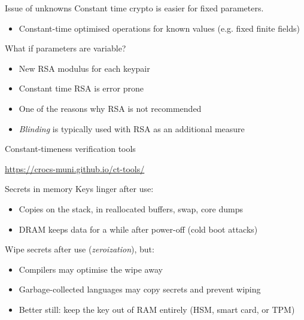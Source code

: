 \begin{frame}{Issue of unknowns}
  Constant time crypto is easier for fixed parameters.
  \begin{itemize}[<+(1)->]
    \item Constant-time optimised operations for known values (e.g. fixed finite fields)
  \end{itemize}

  \vspace*{1em}

  \pause
  What if parameters are variable?
  \begin{itemize}[<+(1)->]
    \item New RSA modulus for each keypair
    \item Constant time RSA is error prone
    \item One of the reasons why RSA is not recommended
    \item \emph{Blinding} is typically used with RSA as an additional measure
  \end{itemize}
\end{frame}

\begin{frame}{Constant-timeness verification tools}
  \begin{center}
    \url{https://crocs-muni.github.io/ct-tools/}
  \end{center}
\end{frame}

\begin{frame}{Secrets in memory}
  Keys linger after use:
  \begin{itemize}[<+(1)->]
    \item Copies on the stack, in reallocated buffers, swap, core dumps
    \item DRAM keeps data for a while after power-off (cold boot attacks)
  \end{itemize}

  \vspace*{1em}

  \pause
  Wipe secrets after use (\emph{zeroization}), but:
  \begin{itemize}[<+(1)->]
    \item Compilers may optimise the wipe away
    \item Garbage-collected languages may copy secrets and prevent wiping
    \item Better still: keep the key out of RAM entirely (HSM, smart card, or TPM)
  \end{itemize}
\end{frame}

